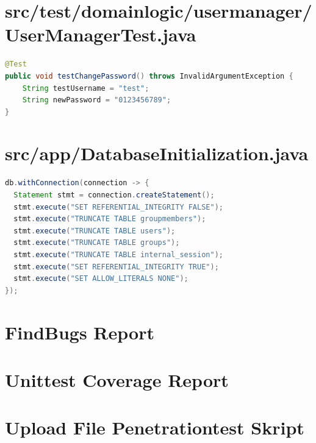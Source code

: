 \documentclass[12pt,DIV14,BCOR10mm,a4paper,parskip=half-,headsepline,headinclude,english,ngerman,bibliography=totocnumbered]{scrreprt}
\begin{document}
\begin{appendices}

\chapter{src/test/domainlogic/\allowbreak usermanager/UserManagerTest.java}
\begin{lstlisting}[language=Java,caption=Hardkodiertes Passwort in einem Test aus der Klasse \texttt{UserManagerTest},label={lst:staticanalysis-hardcoded-pw}]
@Test
public void testChangePassword() throws InvalidArgumentException {
    String testUsername = "test";
    String newPassword = "0123456789";
}
\end{lstlisting}

\chapter{src/app/DatabaseInitialization.java}
\begin{lstlisting}[language=Java,caption=Von SecureAssist gefundenes False Positive Beispiel für Query Injections,label={lst:staticanalysis-query-injection}]
db.withConnection(connection -> {
  Statement stmt = connection.createStatement();
  stmt.execute("SET REFERENTIAL_INTEGRITY FALSE");
  stmt.execute("TRUNCATE TABLE groupmembers");
  stmt.execute("TRUNCATE TABLE users");
  stmt.execute("TRUNCATE TABLE groups");
  stmt.execute("TRUNCATE TABLE internal_session");
  stmt.execute("SET REFERENTIAL_INTEGRITY TRUE");
  stmt.execute("SET ALLOW_LITERALS NONE");
});
\end{lstlisting}

\chapter{FindBugs Report}
\label{staticanalysis-find-bugs}


\chapter{Unittest Coverage Report}
\label{unitcover}


\chapter{Upload File Penetrationtest Skript}
\label{upPenTest}



\end{appendices}
\end{document}
